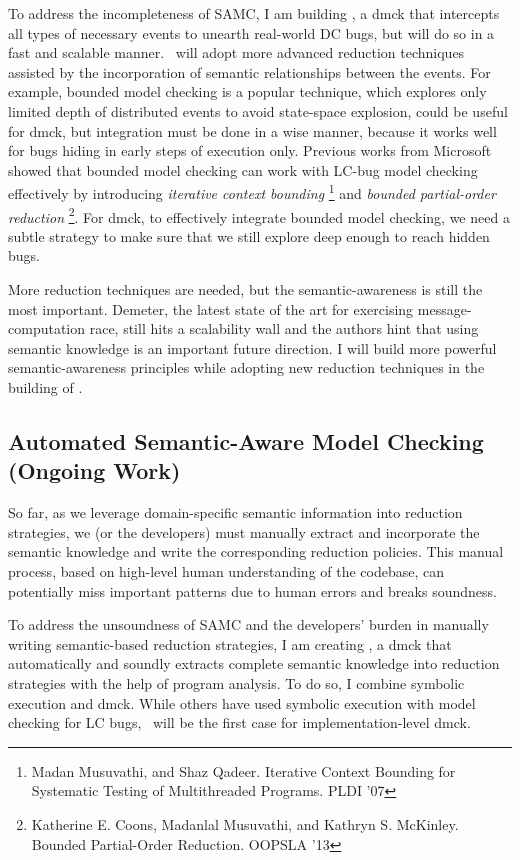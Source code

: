 \documentclass[11pt]{article}
\begin{document}
To address the incompleteness of SAMC, I am building \fullcheck, a dmck that
intercepts all types of necessary events to unearth real-world DC bugs, but will
do so in a fast and scalable manner. \fullcheck\ will adopt more advanced
reduction techniques assisted by the incorporation of semantic relationships
between the events. For example, bounded model checking is a popular technique,
which explores only limited depth of distributed events to avoid state-space
explosion, could be useful for dmck, but integration must be done in a wise
manner, because it works well for bugs hiding in early steps of execution only.
Previous works from Microsoft showed that bounded model checking can work with
LC-bug model checking effectively by introducing \textit{iterative context
bounding} \footnote{Madan Musuvathi, and Shaz Qadeer. Iterative Context Bounding
for Systematic Testing of Multithreaded Programs. PLDI '07} and \textit{bounded
partial-order reduction} \footnote{Katherine E. Coons, Madanlal Musuvathi, and
Kathryn S. McKinley. Bounded Partial-Order Reduction. OOPSLA '13}. For dmck, to
effectively integrate bounded model checking, we need a subtle strategy to make
sure that we still explore deep enough to reach hidden bugs.

More reduction techniques are needed, but the semantic-awareness is still the
most important. Demeter, the latest state of the art for exercising
message-computation race, still hits a scalability wall and the authors hint
that using semantic knowledge is an important future direction. I will build
more powerful semantic-awareness principles while adopting new reduction
techniques in the building of \fullcheck.


\subsection{Automated Semantic-Aware Model Checking (Ongoing Work)} 

So far, as we leverage domain-specific semantic information into reduction
strategies, we (or the developers) must manually extract and incorporate the
semantic knowledge and write the corresponding reduction policies. This manual
process, based on high-level human understanding of the codebase, can
potentially miss important patterns due to human errors and breaks soundness.

To address the unsoundness of SAMC and the developers' burden in manually
writing semantic-based reduction strategies, I am creating \autocheck, a dmck
that automatically and soundly extracts complete semantic knowledge into
reduction strategies with the help of program analysis. To do so, I combine
symbolic execution and dmck. While others have used symbolic execution with
model checking for LC bugs, \autocheck\ will be the first case for
implementation-level dmck. 
\end{document}
